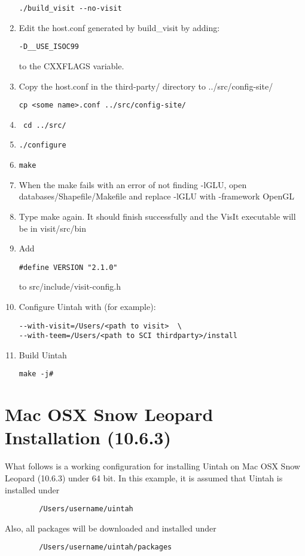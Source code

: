 \documentclass[11pt,fleqn]{book} %
\begin{document}
\begin{enumerate}
\begin{lstlisting}
./build_visit --no-visit 
\end{lstlisting}
\item Edit the host.conf generated by build\_visit by adding: 
\begin{lstlisting}
-D__USE_ISOC99
\end{lstlisting} 
 to the CXXFLAGS variable. 
\item Copy the host.conf in the third-party/ directory to ../src/config-site/ 
\begin{lstlisting}
cp <some name>.conf ../src/config-site/
\end{lstlisting}
\item \begin{lstlisting} cd ../src/ \end{lstlisting}
\item \begin{lstlisting}./configure \end{lstlisting} 
\item \begin{lstlisting}make \end{lstlisting}
\item When the make fails with an error of not finding -lGLU, open databases/Shapefile/Makefile and replace -lGLU with -framework OpenGL
\item Type make again. It should finish successfully and the VisIt executable will be in visit/src/bin
\item Add 
\begin{lstlisting}
#define VERSION "2.1.0"
\end{lstlisting}  
to src/include/visit-config.h
\item Configure Uintah with (for example): 
\begin{lstlisting}
--with-visit=/Users/<path to visit>  \ 
--with-teem=/Users/<path to SCI thirdparty>/install
\end{lstlisting}
\item Build Uintah
\begin{lstlisting}
make -j# 
\end{lstlisting}
\end{enumerate}  
\chapter{Mac OSX Snow Leopard Installation (10.6.3)}
	What follows is a working configuration for installing Uintah on Mac OSX Snow Leopard (10.6.3) under 64 bit. In this example, it is assumed that Uintah is installed under
	\begin{lstlisting}
		/Users/username/uintah
	\end{lstlisting}
	Also, all packages will be downloaded and installed under 
	\begin{lstlisting}
		/Users/username/uintah/packages
	\end{lstlisting}
\end{document}
